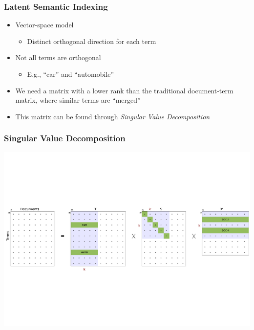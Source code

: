 \documentclass{beamer}
\begin{document}
\begin{frame}
  \frametitle{Latent Semantic Indexing}

  \begin{itemize}
  \item Vector-space model
    \begin{itemize}
    \item Distinct orthogonal direction for each term
    \end{itemize}
  \item Not all terms are orthogonal
    \begin{itemize}
    \item E.g., ``car'' and ``automobile''
    \end{itemize}
  \item We need a matrix with a lower rank than the traditional document-term
    matrix, where similar terms are ``merged''
  \item This matrix can be found through \emph{Singular Value Decomposition}
  \end{itemize}

\end{frame}


\begin{frame}
  \frametitle{Singular Value Decomposition}

  \centering
  \includegraphics[width=\linewidth]{svd}

\end{frame}

\end{document}
